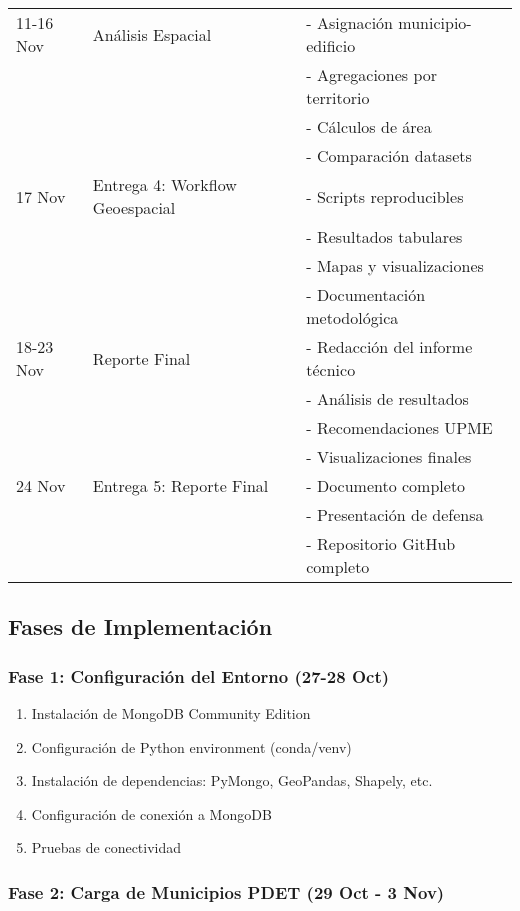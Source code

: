 \documentclass[12pt,a4paper]{article}
\begin{document}
\begin{longtable}{@{}p{}p{}p{}@{}}
11-16 Nov & Análisis Espacial & 
- Asignación municipio-edificio \\
& & - Agregaciones por territorio \\
& & - Cálculos de área \\
& & - Comparación datasets \\ \midrule

17 Nov & Entrega 4: Workflow Geoespacial & 
- Scripts reproducibles \\
& & - Resultados tabulares \\
& & - Mapas y visualizaciones \\
& & - Documentación metodológica \\ \midrule

18-23 Nov & Reporte Final & 
- Redacción del informe técnico \\
& & - Análisis de resultados \\
& & - Recomendaciones UPME \\
& & - Visualizaciones finales \\ \midrule

24 Nov & Entrega 5: Reporte Final & 
- Documento completo \\
& & - Presentación de defensa \\
& & - Repositorio GitHub completo \\ \bottomrule
\end{longtable}

\subsection{Fases de Implementación}

\subsubsection{Fase 1: Configuración del Entorno (27-28 Oct)}

\begin{enumerate}
    \item Instalación de MongoDB Community Edition
    \item Configuración de Python environment (conda/venv)
    \item Instalación de dependencias: PyMongo, GeoPandas, Shapely, etc.
    \item Configuración de conexión a MongoDB
    \item Pruebas de conectividad
\end{enumerate}

\subsubsection{Fase 2: Carga de Municipios PDET (29 Oct - 3 Nov)}
\end{document}
